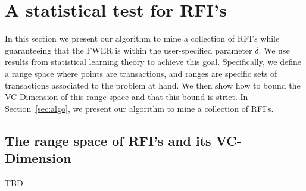\section{A statistical test for RFI's}\label{sec:main}
In this section we present our algorithm to mine a collection of RFI's
while guaranteeing that the FWER is within the user-specified parameter
$\delta$. We use results from statistical learning theory to achieve this goal.
Specifically, we define a range space where points are transactions, and ranges
are specific sets of transactions associated to the problem at hand. We then
show how to bound the VC-Dimension of this range space and that this bound is
strict. In Section~\ref{sec:algo}, we present our algorithm to mine a
collection of RFI's.

\subsection{The range space of RFI's and its VC-Dimension}\label{sec:vcdimbound}
TBD


